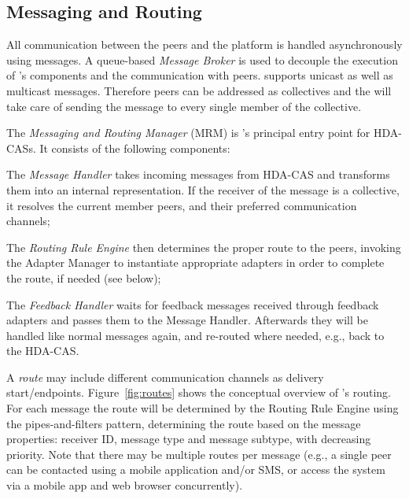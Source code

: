   \subsection{Messaging and Routing}
  \label{sec:middleware:routing}

    All communication between the peers and the platform is handled asynchronously using messages. A queue-based \emph{Message Broker} is used to decouple the execution of \mdl's components and the communication with peers. 
    \mdl{} supports unicast as well as multicast messages. Therefore peers can be addressed as collectives and the \mdl{} will take care of sending the message to every single member of the collective. 
	
    The \emph{Messaging and Routing Manager} (MRM) is \mdl's principal entry point for HDA-CASs. It consists of the following components:
    \begin{inparaenum}
      \item The \emph{Message Handler} takes incoming messages from HDA-CAS and transforms them into an internal representation. If the receiver of the message is a collective, it resolves the current member peers, and their preferred communication channels; 
      \item The \emph{Routing Rule Engine} then determines the proper route to the peers, invoking the Adapter Manager to instantiate appropriate adapters in order to complete the route, if needed (see below); 
      \item The \emph{Feedback Handler} waits for feedback messages received through feedback adapters and  passes them to the Message Handler. Afterwards they will be handled like normal messages again, and re-routed where needed, e.g., back to the HDA-CAS.
    \end{inparaenum}

    
    A \emph{route} may include different communication channels as delivery start/endpoints. Figure~\ref{fig:routes} shows the conceptual overview of \mdl's routing. For each message the route will be determined by the Routing Rule Engine using the pipes-and-filters pattern, determining the route based on the  message properties: receiver ID, message type and message subtype, with decreasing priority. 
    Note that there may be multiple routes per message (e.g., a single peer can be contacted using a mobile application and/or SMS, or access the system via a mobile app and web browser concurrently).

